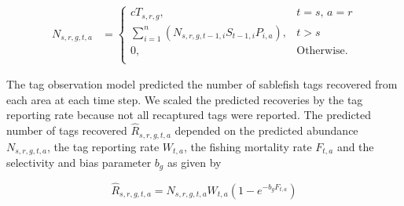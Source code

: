 \documentclass{article}
\begin{document}
% 
\begin{equation}
  \label{eq:predicted-abundance}
  \begin{aligned}
    N_{s,r,g,t,a} &=
      \begin{cases}
        c T_{s,r,g}, & t = s \text{, } a = r \\
        \sum_{i=1}^n \left( N_{s,r,g,t-1,i} S_{t-1,i} P_{i,a} \right), & t > s \\
        0, & \text{Otherwise.} \\
      \end{cases}
  \end{aligned}
\end{equation} 

The tag observation model predicted the number of sablefish tags recovered from each area at each time step. We scaled the predicted recoveries by the tag reporting rate because not all recaptured tags were reported. The predicted number of tags recovered $\hat{R}_{s,r,g,t,a}$ depended on the predicted abundance $N_{s,r,g,t,a}$, the tag reporting rate $W_{t, a}$, the fishing mortality rate $F_{t, a}$ and the selectivity and bias parameter $b_g$ as given by

\begin{equation}
  \label{eq:predicted-recoveries}
  \hat{R}_{s,r,g,t,a} = N_{s,r,g,t,a} W_{t,a} \left(1 - e^{-b_g F_{t,a}} \right)
\end{equation}
\end{document}
